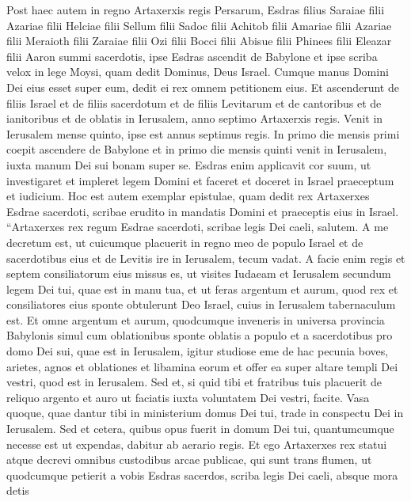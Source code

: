 \begin{biblechapter}  
\verse Post haec autem in regno Artaxerxis regis Persarum, Esdras filius Saraiae filii Azariae filii Helciae 
\verse filii Sellum filii Sadoc filii Achitob 
\verse filii Amariae filii Azariae filii Meraioth 
\verse filii Zaraiae filii Ozi filii Bocci 
\verse filii Abisue filii Phinees filii Eleazar filii Aaron summi sacerdotis,  
\verse ipse Esdras ascendit de Babylone et ipse scriba velox in lege Moysi, quam dedit Dominus, Deus Israel. Cumque manus Domini Dei eius esset super eum, dedit ei rex omnem petitionem eius. 
\verse Et ascenderunt de filiis Israel et de filiis sacerdotum et de filiis Levitarum et de cantoribus et de ianitoribus et de oblatis in Ierusalem, anno septimo Artaxerxis regis. 
\verse Venit in Ierusalem mense quinto, ipse est annus septimus regis. 
\verse In primo die mensis primi coepit ascendere de Babylone et in primo die mensis quinti venit in Ierusalem, iuxta manum Dei sui bonam super se. 
\verse Esdras enim applicavit cor suum, ut investigaret et impleret legem Domini et faceret et doceret in Israel praeceptum et iudicium. 
\verse Hoc est autem exemplar epistulae, quam dedit rex Artaxerxes Esdrae sacerdoti, scribae erudito in mandatis Domini et praeceptis eius in Israel. 
\verse “Artaxerxes rex regum Esdrae sacerdoti, scribae legis Dei caeli, salutem. 
\verse A me decretum est, ut cuicumque placuerit in regno meo de populo Israel et de sacerdotibus eius et de Levitis ire in Ierusalem, tecum vadat. 
\verse A facie enim regis et septem consiliatorum eius missus es, ut visites Iudaeam et Ierusalem secundum legem Dei tui, quae est in manu tua, 
\verse et ut feras argentum et aurum, quod rex et consiliatores eius sponte obtulerunt Deo Israel, cuius in Ierusalem tabernaculum est. 
\verse Et omne argentum et aurum, quodcumque inveneris in universa provincia Babylonis simul cum oblationibus sponte oblatis a populo et a sacerdotibus pro domo Dei sui, quae est in Ierusalem, 
\verse igitur studiose eme de hac pecunia boves, arietes, agnos et oblationes et libamina eorum et offer ea super altare templi Dei vestri, quod est in Ierusalem. 
\verse Sed et, si quid tibi et fratribus tuis placuerit de reliquo argento et auro ut faciatis iuxta voluntatem Dei vestri, facite. 
\verse Vasa quoque, quae dantur tibi in ministerium domus Dei tui, trade in conspectu Dei in Ierusalem. 
\verse Sed et cetera, quibus opus fuerit in domum Dei tui, quantumcumque necesse est ut expendas, dabitur ab aerario regis. 
\verse Et ego Artaxerxes rex statui atque decrevi omnibus custodibus arcae publicae, qui sunt trans flumen, ut quodcumque petierit a vobis Esdras sacerdos, scriba legis Dei caeli, absque mora detis 

\end{biblechapter}
